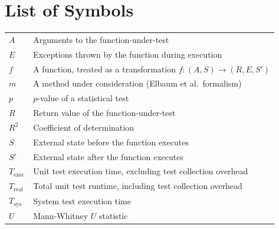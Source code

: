 \chapter{List of Symbols}

\def\arraystretch{1.5}
\begin{longtable}[l]{l l}
    $A$             & Arguments to the function-under-test                                       \\
    $E$             & Exceptions thrown by the function during execution                         \\
    $f$             & A function, treated as a transformation $f: (A, S) \rightarrow (R, E, S')$ \\
    $m$             & A method under consideration (Elbaum et al.\ formalism)                    \\
    $p$             & $p$-value of a statistical test                                            \\
    $R$             & Return value of the function-under-test                                    \\
    $R^2$           & Coefficient of determination                                               \\
    $S$             & External state before the function executes                                \\
    $S'$            & External state after the function executes                                 \\
    $T_\text{exec}$ & Unit test execution time, excluding test collection overhead               \\
    $T_\text{real}$ & Total unit test runtime, including test collection overhead                \\
    $T_\text{sys}$  & System test execution time                                                 \\
    $U$             & Mann-Whitney $U$ statistic                                                 \\
\end{longtable}
\def\arraystretch{1}